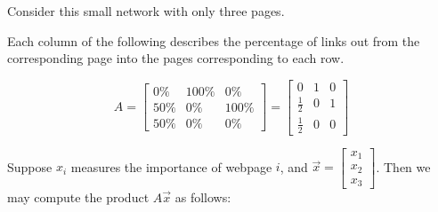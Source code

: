 \begin{applicationActivities}{5}{29}
\begin{example}
Consider this small network with only three pages.

\begin{multicols}{2}
\begin{center}
\end{center}

Each column of the following 
describes the percentage of links out from the corresponding page
into the pages corresponding to each row.

\[
  A
    =
  \begin{bmatrix}
    0\% & 100\% & 0\% \\
    50\% & 0\% & 100\% \\
    50\% & 0\% & 0\%
  \end{bmatrix}
    =
  \begin{bmatrix}
    0 & 1 & 0 \\
    \frac{1}{2} & 0 & 1 \\
    \frac{1}{2} & 0 & 0
  \end{bmatrix}
\]
\end{multicols}
\end{example}

\begin{activity}{5}
  Suppose \(x_i\) measures the importance of webpage \(i\), and
  \(\vec{x}=\begin{bmatrix}x_1\\x_2\\x_3\end{bmatrix}\).
  Then we may compute the product \(A\vec x\) as follows:


\end{activity}
\end{applicationActivities}
